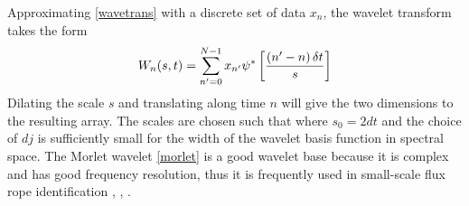 \noindent Approximating \eqref{wavetrans} with a discrete set of data $x_n$, the wavelet transform takes the form %
\begin{equation}
    W_n(s,t) = \sum_{n'=0}^{N-1}x_{n'}\psi^*\left[ \frac{\left( n'-n \right)\delta t}{s} \right]
    \label{eq:wavetrans2}
\end{equation}
Dilating the scale $s$ and translating along time $n$ will give the two dimensions to the resulting array. The scales are chosen such that
where $s_0 = 2dt$ and the choice of $dj$ is sufficiently small for the width of the wavelet basis function in spectral space. The Morlet wavelet \eqref{morlet} is a good wavelet base because it is complex and has good frequency resolution, thus it is frequently used in small-scale flux rope identification \cite{Telloni:2012}, \cite{Telloni:2013}, \cite{Zhao:2020}.




